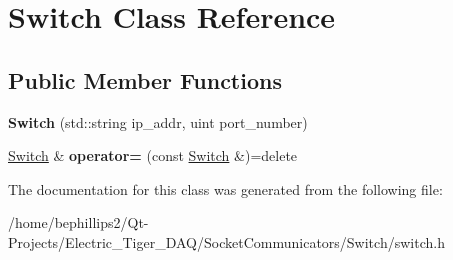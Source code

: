 \hypertarget{class_switch}{}\section{Switch Class Reference}
\label{class_switch}
\subsection*{Public Member Functions}
\begin{DoxyCompactItemize}
\item 
{\bfseries Switch} (std\+::string ip\+\_\+addr, uint port\+\_\+number)\hypertarget{class_switch_a8075f9eb1d911ee97166f9d6c424b766}{}\label{class_switch_a8075f9eb1d911ee97166f9d6c424b766}

\item 
\hyperlink{class_switch}{Switch} \& {\bfseries operator=} (const \hyperlink{class_switch}{Switch} \&)=delete\hypertarget{class_switch_a5d75382f2acb13883c3ef60d8b2aef7d}{}\label{class_switch_a5d75382f2acb13883c3ef60d8b2aef7d}

\end{DoxyCompactItemize}


The documentation for this class was generated from the following file\+:\begin{DoxyCompactItemize}
\item 
/home/bephillips2/\+Qt-\/\+Projects/\+Electric\+\_\+\+Tiger\+\_\+\+D\+A\+Q/\+Socket\+Communicators/\+Switch/switch.\+h\end{DoxyCompactItemize}
